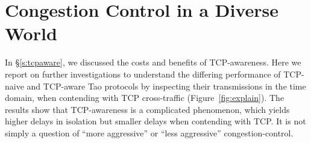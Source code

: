 \section{Congestion Control in a Diverse World}
\label{s:diversity}

In \S\ref{s:tcpaware}, we discussed the costs and benefits of
TCP-awareness. Here we report on further investigations to understand
the differing performance of TCP-naive and TCP-aware Tao protocols by
inspecting their transmissions in the time domain, when contending
with TCP cross-traffic (Figure~\ref{fig:explain}). The results show
that TCP-awareness is a complicated phenomenon, which yields higher
delays in isolation but smaller delays when contending with TCP. It is
not simply a question of ``more aggressive'' or ``less aggressive''
congestion-control.

